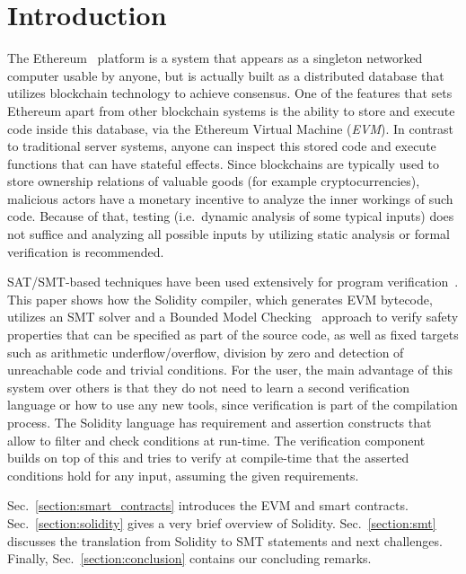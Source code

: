 \section{Introduction}
The Ethereum~\cite{WhitePaper} platform is a system that appears as a
singleton networked computer usable by anyone, but is actually built as a
distributed database that utilizes blockchain technology to achieve consensus.
%
One of the features that sets Ethereum apart from other blockchain systems is
the ability to store and execute code inside this database, via the Ethereum
Virtual Machine (\emph{EVM}).
%
In contrast to traditional server systems, anyone can inspect this stored code
and execute functions that can have stateful effects.
%
Since blockchains are typically used to store ownership relations of valuable goods
(for example
cryptocurrencies),
malicious actors have a monetary incentive to analyze the inner
workings of such code. Because of that, testing (i.e.\  dynamic analysis of some
typical inputs) does not suffice and analyzing all possible inputs by utilizing
static analysis or formal verification is recommended.

SAT/SMT-based techniques have been used extensively for program 
verification~\cite{Biere99,Donaldson11,Komuravelli13,Beyer11,Kroening14,Alt17}.
%
This paper shows how the Solidity compiler, which generates EVM bytecode,
utilizes an SMT solver and a Bounded Model Checking~\cite{Biere99} approach to
verify safety properties that can be specified as part of the source code, as
well as fixed targets such as arithmetic underflow/overflow, division by zero and detection of
unreachable code and trivial conditions.
%
For the user, the main advantage of this system over others is that they do not
need to learn a second verification language or how to use any new tools, since
verification is part of the compilation process.
%
The Solidity language has requirement and assertion constructs that allow to
filter and check conditions at run-time.  The verification component
builds on top of this and tries to
verify at compile-time that the asserted conditions hold for any input,
assuming the given requirements.

Sec.~\ref{section:smart_contracts} introduces the EVM and smart contracts.
Sec.~\ref{section:solidity} gives a very brief overview of Solidity. Sec.~\ref{section:smt} discusses the translation from Solidity to SMT
statements and next challenges. Finally, Sec.~\ref{section:conclusion}
contains our concluding remarks.

